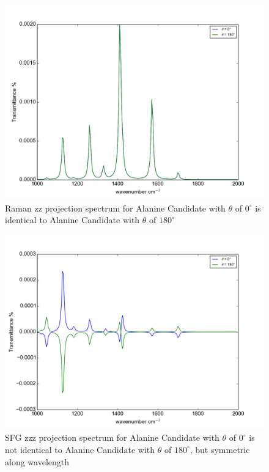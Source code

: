 \begin{figure}[!ht] 
\centering
\includegraphics[scale=0.7]{Figures/Ala_candidates_plotting_raman_zz_2.png}
\caption{Raman zz projection spectrum for Alanine Candidate with $\theta$ of $0^{\circ}$ is identical to Alanine Candidate with $\theta$ of $180^{\circ}$} \label{fig:5.8}
\end{figure}

\begin{figure}[!ht] 
\centering
\includegraphics[scale=0.7]{Figures/Ala_candidates_plotting_sfg_zzz_2.png}
\caption{SFG zzz projection spectrum for Alanine Candidate with $\theta$ of $0^{\circ}$ is not identical to Alanine Candidate with $\theta$ of $180^{\circ}$, but symmetric along wavelength} \label{fig:5.9}
\end{figure}
